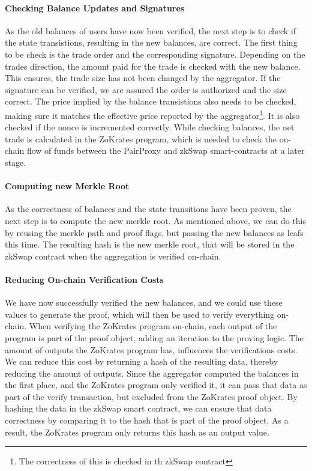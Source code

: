 \documentclass[../../thesis.tex]{subfiles}
\begin{document}
\paragraph{Checking Balance Updates and Signatures}
As the old balances of users have now been verified, the next step is to check if the state transistions, resulting in the new balances, are correct. The first thing to be check is the trade order and the corresponding signature. Depending on the trades direction, the amount paid for the trade is checked with the new balance. This ensures, the trade size has not been changed by the aggregator. If the signature can be verified, we are assured the order is authorized and the size correct. The price implied by the balance transistions also needs to be checked, making sure it matches the effective price reported by the aggregator\footnote{The correctness of this is checked in th zkSwap contract}. It is also checked if the nonce is incremented correctly. While checking balances, the net trade is calculated in the ZoKrates program, which is needed to check the on-chain flow of funds between the PairProxy and zkSwap smart-contracts at a later stage. 

\paragraph{Computing new Merkle Root}
As the correctness of balances and the state transitions have been proven, the next step is to compute the new merkle root. As mentioned above, we can do this by reusing the merkle path and proof flags, but passing the new balances as leafs this time. The resulting hash is the new merkle root, that will be stored in the zkSwap contract when the aggregation is verified on-chain. 

\paragraph{Reducing On-chain Verification Costs}
We have now successfully verified the new balances, and we could use these values to generate the proof, which will then be used to verify everything on-chain. When verifying the ZoKrates program on-chain, each output of the program is part of the proof object, adding an iteration to the proving logic. The amount of outputs the ZoKrates program has, influences the verifications costs. We can reduce this cost by returning a hash of the resulting data, thereby reducing the amount of outputs. Since the aggregator computed the balances in the first place, and the ZoKrates program only verified it, it can pass that data as part of the verify transaction, but excluded from the ZoKrates proof object. By hashing the data in the zkSwap smart contract, we can ensure that data correctness by comparing it to the hash that is part of the proof object. As a result, the ZoKrates program only returns this hash as an output value. 
\end{document}
